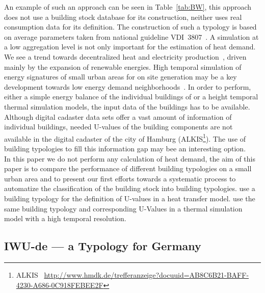 An example of such an approach can be seen in Table~\ref{tab:BW}, this approach
does not use a building stock database for its construction, neither uses real
consumption data for its definition. The construction of such a typology is
based on average parameters taken from national guideline 
VDI~3807~\cite{VDI-3807.1994}. A simulation at a low
aggregation level is not only important for the estimation of heat demand.
We see a trend towards decentralized heat and
electricity production~\cite{KEMA.2012}, driven mainly by the expansion of
renewable energies. High temporal simulation of energy signatures of small
urban areas for on site generation may be a key development towards low energy
demand neighborhoods~\cite{Koch.2013}. In order to perform, either a simple
energy balance of the individual buildings of or a height temporal thermal
simulation models, the input data of the buildings has to be available.
Although digital cadaster data sets offer a vast amount of information of
individual buildings, needed U-values of the building components are not
available in the digital cadaster of the city of Hamburg
(ALKIS\footnote{ALKIS~\cite{AdV.2008}
\url{http://www.hmdk.de/trefferanzeige?docuuid=AB8C6B21-BAFF-4230-A686-0C918FEBEE2F}}).
The use of building typologies to fill this information gap may bee an
interesting option.\\



In this paper we do not perform any calculation of heat demand, the aim of this
paper is to compare the performance of different building typologies on a small
urban area and to present our first efforts towards a systematic process to
automatize the classification of the building stock into building typologies.
 use a building typology for the definition of U-values 
in a heat transfer model.
 use the same building typology and corresponding U-Values
in a thermal simulation model with a high temporal resolution.
\\

\subsection{IWU-de --- a Typology for Germany}\label{sub-sec:IWU-de}

